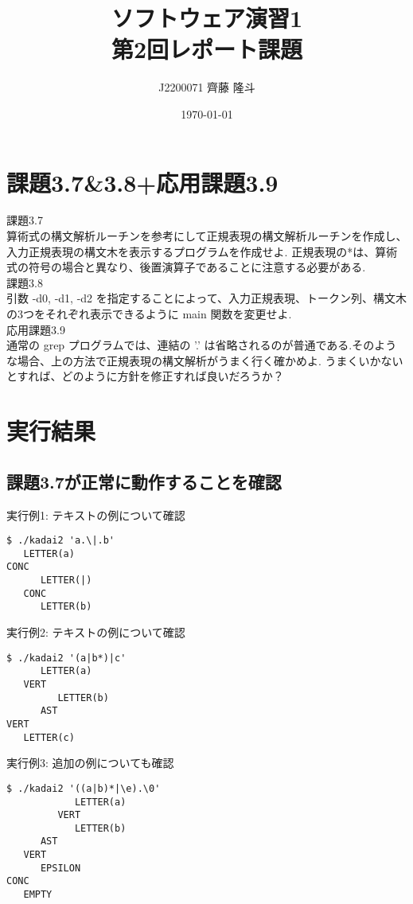 \documentclass{jsarticle}
\title{ソフトウェア演習1 \\
第2回レポート課題}
\author{J2200071 齊藤 隆斗}
\date{\today}
\theoremstyle{plain}
\begin{document}
\maketitle


\section{課題3.7\&3.8+応用課題3.9}
課題3.7 \\
算術式の構文解析ルーチンを参考にして正規表現の構文解析ルーチンを作成し、入力正規表現の構文木を表示するプログラムを作成せよ.
正規表現の*は、算術式の符号の場合と異なり、後置演算子であることに注意する必要がある. \\

課題3.8 \\
引数 -d0, -d1, -d2 を指定することによって、入力正規表現、トークン列、構文木の3つをそれぞれ表示できるように main 関数を変更せよ. \\

応用課題3.9 \\
通常の grep プログラムでは、連結の '.' は省略されるのが普通である.そのような場合、上の方法で正規表現の構文解析がうまく行く確かめよ.
うまくいかないとすれば、どのように方針を修正すれば良いだろうか？ \\


\section{実行結果}

\subsection*{課題3.7が正常に動作することを確認}

実行例1: テキストの例について確認
\begin{lstlisting}
$ ./kadai2 'a.\|.b'
   LETTER(a)
CONC
      LETTER(|)
   CONC
      LETTER(b)
\end{lstlisting}

実行例2: テキストの例について確認
\begin{lstlisting}
$ ./kadai2 '(a|b*)|c'
      LETTER(a)
   VERT
         LETTER(b)
      AST
VERT
   LETTER(c)
\end{lstlisting}

実行例3: 追加の例についても確認
\begin{lstlisting}
$ ./kadai2 '((a|b)*|\e).\0'
            LETTER(a)
         VERT
            LETTER(b)
      AST
   VERT
      EPSILON
CONC
   EMPTY
\end{lstlisting}
\end{document}

